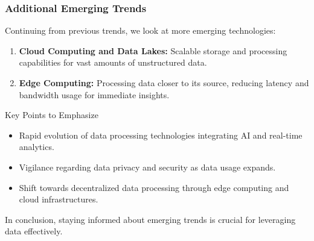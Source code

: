 \documentclass{beamer}
\begin{document}
\begin{frame}[fragile]
    \frametitle{Additional Emerging Trends}
    Continuing from previous trends, we look at more emerging technologies:

    \begin{enumerate}[resume]
        \item \textbf{Cloud Computing and Data Lakes:} Scalable storage and processing capabilities for vast amounts of unstructured data.
        \item \textbf{Edge Computing:} Processing data closer to its source, reducing latency and bandwidth usage for immediate insights.
    \end{enumerate}
    
    \begin{block}{Key Points to Emphasize}
        \begin{itemize}
            \item Rapid evolution of data processing technologies integrating AI and real-time analytics.
            \item Vigilance regarding data privacy and security as data usage expands.
            \item Shift towards decentralized data processing through edge computing and cloud infrastructures.
        \end{itemize}
    \end{block}
    
    In conclusion, staying informed about emerging trends is crucial for leveraging data effectively.
\end{frame}
\end{document}
